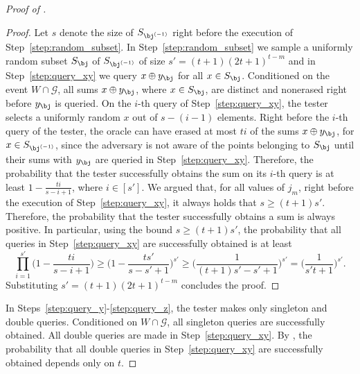 \documentclass{toc}
\begin{document}
\begin{proof}[Proof of ]
\begin{proof}
%
Let $s$ denote the size of $S_{\bj^{(-1)}}$ right before the execution of Step~\ref{step:random_subset}. In  Step~\ref{step:random_subset} we sample a uniformly random subset $S_{\bj}$ of $S_{\bj^{(-1)}}$ of size $s' = (t+1)(2t+1)^{t-m}$ and in Step~\ref{step:query_xy} we query $x \oplus y_{\bj}$ for all $x \in S_{\bj}$. Conditioned on the event $W \cap \mathcal{G}$, all sums $x \oplus  y_{\bj}$, where $x\in S_{\bj}$, are distinct and nonerased right before $y_{\bj}$ is queried. On the $i$-th query of Step~\ref{step:query_xy}, the tester selects a uniformly random $x$ out of $s-(i-1)$ elements. Right before the $i$-th query of the tester, the oracle can have erased at most $ti$ of the sums $x \oplus y_{\bj}$, for $x \in S_{\bj^{(-1)}}$, since the adversary is not aware of the points belonging to $S_{\bj}$ until their sums with $ y_{\bj}$ are queried in Step~\ref{step:query_xy}. Therefore, the probability that the tester successfully obtains the sum on its $i$-th query is at least $1 - \frac{ti}{s-i+1}$, where $i \in [s']$. We argued that, for all values of $j_m$, right before the execution of Step~\ref{step:query_xy}, it always holds that $s \geq (t+1)s'$. Therefore, the probability that the tester successfully obtains a sum is always positive. In particular, using the bound $s \geq (t+1)s'$, the probability that all queries in Step~\ref{step:query_xy} are successfully obtained is at least
\begin{equation*}
        \prod_{i=1}^{s'} \Big( 1 - \frac{ti}{s-i + 1} \Big) 
        \geq \Big( 1 - \frac{ts'}{s-s' + 1} \Big)^{s'} 
        \geq \Big( \frac{1}{(t+1)s' - s' + 1} \Big)^{s'}
        =  \Big(\frac{1}{s't+1} \Big)^{s'}.
    \end{equation*}
Substituting $s' = (t+1)(2t+1)^{t-m}$ concludes the proof. 
\end{proof}
 
In Steps~\ref{step:query_y}-\ref{step:query_z}, the tester makes only singleton and double queries. Conditioned on $W \cap \mathcal{G}$, all singleton queries are successfully obtained. All double queries are made in Step~\ref{step:query_xy}. By , the probability that all double queries in Step~\ref{step:query_xy} are successfully obtained depends only on $t$. 
    

\end{proof}
\end{document}
